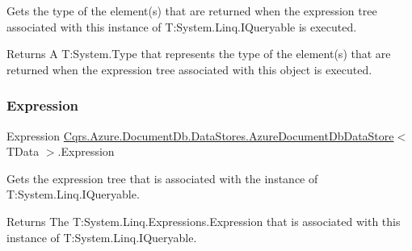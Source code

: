 Gets the type of the element(s) that are returned when the expression tree associated with this instance of T\+:\+System.\+Linq.\+I\+Queryable is executed. 

\begin{DoxyReturn}{Returns}
A T\+:\+System.\+Type that represents the type of the element(s) that are returned when the expression tree associated with this object is executed. 
\end{DoxyReturn}
\mbox{\label{classCqrs_1_1Azure_1_1DocumentDb_1_1DataStores_1_1AzureDocumentDbDataStore_a47d5ae1b47f4166210d1caab58467529}} 
\subsubsection{\texorpdfstring{Expression}{Expression}}
{\footnotesize\ttfamily Expression \hyperlink{classCqrs_1_1Azure_1_1DocumentDb_1_1DataStores_1_1AzureDocumentDbDataStore}{Cqrs.\+Azure.\+Document\+Db.\+Data\+Stores.\+Azure\+Document\+Db\+Data\+Store}$<$ T\+Data $>$.Expression\hspace{0.3cm}{\ttfamily [get]}}



Gets the expression tree that is associated with the instance of T\+:\+System.\+Linq.\+I\+Queryable. 

\begin{DoxyReturn}{Returns}
The T\+:\+System.\+Linq.\+Expressions.\+Expression that is associated with this instance of T\+:\+System.\+Linq.\+I\+Queryable. 
\end{DoxyReturn}
\mbox{\label{classCqrs_1_1Azure_1_1DocumentDb_1_1DataStores_1_1AzureDocumentDbDataStore_af46a754a1576e4c2422b8a5d642abc5c}} 
